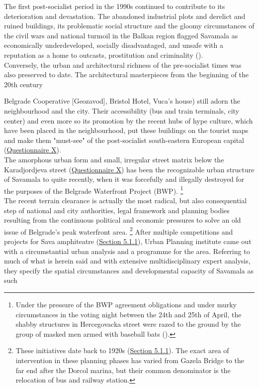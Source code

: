 \documentclass[11pt]{report}
\begin{document}
The first post-socialist period in the 1990s continued to contribute to its deterioration and devastation. The abandoned industrial plots and derelict and ruined buildings, its problematic social structure and the gloomy circumstances of the  civil wars and national turmoil in the Balkan region flagged Savamala as economically underdeveloped, socially disadvantaged, and unsafe with a reputation as a home to outcasts, prostitution and criminality (\citealt{cvetinovic_engine_2013}).
\\

Conversely, the urban and architectural richness of the pre-socialist times was also preserved to date.
The architectural masterpieces from the beginning of the 20th century {Belgrade Cooperative [Geozavod], Bristol Hotel, Vuca's house) still adorn the neighbourhood and the city.
Their accessibility (bus and train terminals, city center) and even more so its promotion by the recent hubs of hype culture, which have been placed in the neighbourhood, put these buildings on the tourist maps and make them "must-see" of the post-socialist south-eastern European capital (\href{Questionnaire Experts Savamala}{Questionnaire X}).
\\

The amorphous urban form and small, irregular street matrix below the Karadjordjeva street (\href{Questionnaire PhD students}{Questionnaire X}) has been the recognizable urban structure of Savamala to quite recently, when it was forcefully and illegally destroyed for the purposes of the Belgrade Waterfront Project (BWP).
\footnote{Under the pressure of the BWP agreement obligations and under murky circumstances in the voting night between the 24th and 25th of April, the shabby structures in Hercegovacka street were razed to the ground by the group of masked men armed with baseball bats (\citealt{popovic_porusili_2016}).} %
\\

The recent terrain clearance is actually the most radical, but also consequential step of national and city authorities, legal framework and planning bodies resulting from the continuous political and economic pressures to solve an old issue of Belgrade’s peak waterfront area.
\footnote{These initiatives date back to 1920s (\href{Section 5.1.1}{Section 5.1.1}).
The exact area of intervention in these planning phases has varied from Gazela Bridge to the far end after the Dorcol marina, but their common denominator is the relocation of bus and railway station.}
After multiple competitions and projects for Sava amphiteatre (\href{Section 5.1.1}{Section 5.1.1}), Urban Planning institute came out with a circumstantial urban analysis and a programme for the area.
Referring to much of what is herein said and with extensive multidisciplinary expert analysis, they specify the spatial circumstances and developmental capacity of Savamala as such 

}
\end{document}
